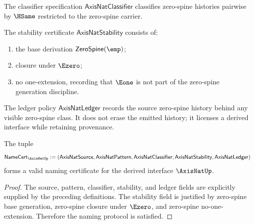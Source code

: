 \begin{definition}
\label{def:axisnat-classifier-specification}
The classifier specification \(\mathsf{AxisNatClassifier}\) classifies zero-spine histories pairwise by \(\HSame\) restricted to the zero-spine carrier.
\end{definition}

\begin{definition}
\label{def:axisnat-stability-certificate}
The stability certificate \(\mathsf{AxisNatStability}\) consists of:
\begin{enumerate}
  \item the base derivation \(\mathsf{ZeroSpine}(\emp)\);
  \item closure under \(\Ezero\);
  \item no one-extension, recording that \(\Eone\) is not part of the zero-spine generation discipline.
\end{enumerate}
\end{definition}

\begin{definition}
\label{def:axisnat-ledger-policy}
The ledger policy \(\mathsf{AxisNatLedger}\) records the source zero-spine history behind any visible zero-spine class. It does not erase the emitted history; it licenses a derived interface while retaining provenance.
\end{definition}

\begin{theorem}
\label{thm:concrete-axisnat-namecert}
The tuple
$$
  \mathsf{NameCert}_{\AxisNatUp}
  :=
  (\mathsf{AxisNatSource},
   \mathsf{AxisNatPattern},
   \mathsf{AxisNatClassifier},
   \mathsf{AxisNatStability},
   \mathsf{AxisNatLedger})
$$
forms a valid naming certificate for the derived interface \(\AxisNatUp\).
\end{theorem}
\begin{proof}
The source, pattern, classifier, stability, and ledger fields are explicitly supplied by the preceding definitions. The stability field is justified by zero-spine base generation, zero-spine closure under \(\Ezero\), and zero-spine no-one-extension. Therefore the naming protocol is satisfied.
\end{proof}

